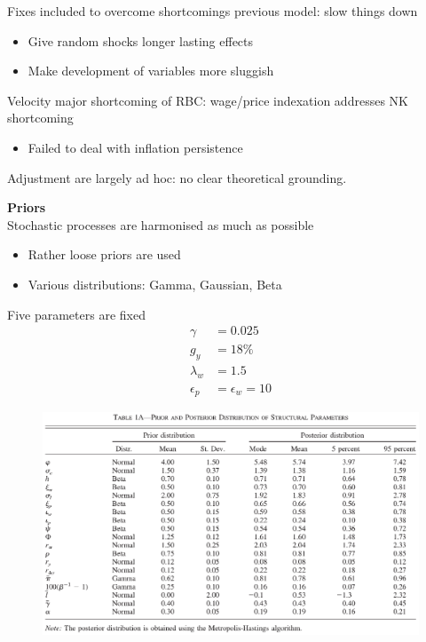 \documentclass{beamer}
\begin{document}
\begin{frame}
  Fixes included to overcome shortcomings previous model: slow things down
  \begin{itemize}
    \item Give random shocks longer lasting effects
    \item Make development of variables more sluggish
  \end{itemize}
  \medskip
  Velocity major shortcoming of RBC: wage/price indexation addresses NK shortcoming
  \begin{itemize}
    \item Failed to deal with inflation persistence
  \end{itemize}
  \medskip
  Adjustment are largely ad hoc: no clear theoretical grounding.
\end{frame}

\begin{frame}
  \textbf{Priors}\\
  Stochastic processes are harmonised as much as possible
  \begin{itemize}
    \item Rather loose priors are used 
    \item Various distributions: Gamma, Gaussian, Beta
  \end{itemize}
  \medskip
  Five parameters are fixed
  \begin{align}
    \gamma &=0.025\\
    g_y &= 18\%\\
    \lambda_w &= 1.5\\
    \epsilon_p&=\epsilon_w=10
  \end{align}  
\end{frame}


\begin{frame}
  \begin{figure}
     \includegraphics[scale=.7]{sw_table1.eps}
   \end{figure} 
\end{frame}
\end{document}
